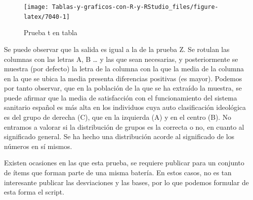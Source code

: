 \documentclass[
]{book}
\begin{document}
\begin{figure}[H]

{\centering \texttt{[image: Tablas-y-graficos-con-R-y-RStudio\_files/figure-latex/7040-1]} 

}

\caption{Prueba t en tabla}\label{fig:7040}
\end{figure}

Se puede observar que la salida es igual a la de la prueba Z. Se rotulan las columnas con las letras A, B \ldots{} y las que sean necesarias, y posteriormente se muestra (por defecto) la letra de la columna con la que la media de la columna en la que se ubica la media presenta diferencias positivas (es mayor). Podemos por tanto observar, que en la población de la que se ha extraído la muestra, se puede afirmar que la media de satisfacción con el funcionamiento del sistema sanitario español es más alta en los individuos cuya auto clasificación ideológica es del grupo de derecha (C), que en la izquierda (A) y en el centro (B). No entramos a valorar si la distribución de grupos es la correcta o no, en cuanto al significado general. Se ha hecho una distribución acorde al significado de los números en sí mismos.

Existen ocasiones en las que esta prueba, se requiere publicar para un conjunto de ítems que forman parte de una misma batería. En estos casos, no es tan interesante publicar las desviaciones y las bases, por lo que podemos formular de esta forma el script.
\end{document}
